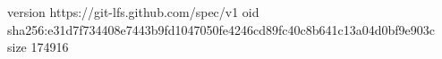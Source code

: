 version https://git-lfs.github.com/spec/v1
oid sha256:e31d7f734408e7443b9fd1047050fe4246cd89fc40c8b641c13a04d0bf9e903c
size 174916

